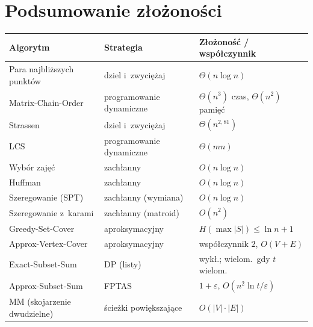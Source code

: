 \documentclass[11pt,a4paper]{article}
\theoremstyle{plain}
\theoremstyle{definition}
\newcommand{\eps}{\varepsilon}
\begin{document}
\section*{Podsumowanie złożoności}
\begin{center}
\renewcommand{\arraystretch}{1.25}
\begin{tabular}{@{}lll@{}}
\toprule
Algorytm & Strategia & Złożoność / współczynnik\\
\midrule
Para najbliższych punktów & dziel i~zwyciężaj & $\Theta(n\log n)$\\
Matrix-Chain-Order & programowanie dynamiczne & $\Theta(n^3)$ czas, $\Theta(n^2)$ pamięć\\
Strassen & dziel i~zwyciężaj & $\Theta(n^{2{,}81})$\\
LCS & programowanie dynamiczne & $\Theta(mn)$\\
Wybór zajęć & zachłanny & $O(n\log n)$\\
Huffman & zachłanny & $O(n\log n)$\\
Szeregowanie (SPT) & zachłanny (wymiana) & $O(n\log n)$\\
Szeregowanie z~karami & zachłanny (matroid) & $O(n^2)$\\
Greedy-Set-Cover & aproksymacyjny & $H(\max|S|)\le\ln n+1$\\
Approx-Vertex-Cover & aproksymacyjny & współczynnik $2$, $O(V+E)$\\
Exact-Subset-Sum & DP (listy) & wykł.; wielom.\ gdy $t$ wielom.\\
Approx-Subset-Sum & FPTAS & $1+\eps$, $O(n^2\ln t/\eps)$\\
MM (skojarzenie dwudzielne) & ścieżki powiększające & $O(|V|\cdot|E|)$\\
\bottomrule
\end{tabular}
\end{center}
\end{document}
